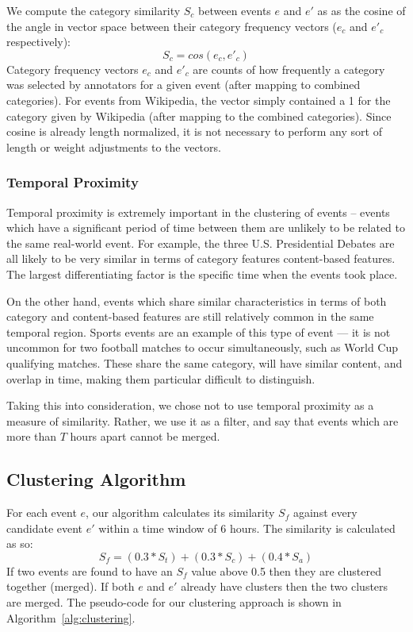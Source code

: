 We compute the category similarity $S_c$ between events $e$ and $e'$ as as the cosine of the angle in vector space between their category frequency vectors ($e_c$ and $e'_c$ respectively):
\begin{equation}
	S_c = cos(e_c, e'_c)
\end{equation}
Category frequency vectors $e_c$ and $e'_c$ are counts of how frequently a category was selected by annotators for a given event (after mapping to combined categories). For events from Wikipedia, the vector simply contained a 1 for the category given by Wikipedia (after mapping to the combined categories).
Since cosine is already length normalized, it is not necessary to perform any sort of length or weight adjustments to the vectors.

\subsubsection{Temporal Proximity}
Temporal proximity is extremely important in the clustering of events -- events which have a significant period of time between them are unlikely to be related to the same real-world event.
For example, the three U.S. Presidential Debates are all likely to be very similar in terms of category features content-based features.
The largest differentiating factor is the specific time when the events took place.

On the other hand, events which share similar characteristics in terms of both category and content-based features are still relatively common in the same temporal region.
Sports events are an example of this type of event --- it is not uncommon for two football matches to occur simultaneously, such as World Cup qualifying matches.
These share the same category, will have similar content, and overlap in time, making them particular difficult to distinguish.

Taking this into consideration, we chose not to use temporal proximity as a measure of similarity.
Rather, we use it as a filter, and say that events which are more than $T$ hours apart cannot be merged.

\subsection{Clustering Algorithm}
\label{sec:clusteringalg}
For each event \(e\), our algorithm calculates its similarity $S_f$ against every candidate event \(e'\) within a time window of 6 hours.
The similarity is calculated as so:
\begin{equation} \label{eq:simcluster}
S_{f} = (0.3 * S_{t}) + (0.3 * S_{c}) + (0.4 * S_{a})
\end{equation}
If two events are found to have an \(S_{f}\) value above 0.5 then they are clustered together (merged).
If both \(e\) and \(e'\) already have clusters then the two clusters are merged.
The pseudo-code for our clustering approach is shown in Algorithm~\ref{alg:clustering}.

